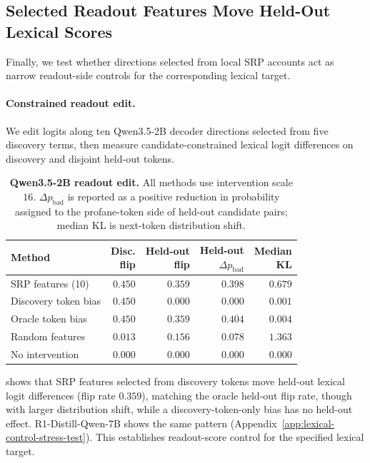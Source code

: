 \FloatBarrier

\subsection{Selected Readout Features Move Held-Out Lexical Scores}
\label{sec:readout-feature-edits}

Finally, we test whether directions selected from local SRP accounts act as
narrow readout-side controls for the corresponding lexical target.

\paragraph{Constrained readout edit.}
We edit logits along ten Qwen3.5-2B decoder directions selected from five
discovery terms, then measure candidate-constrained lexical logit differences on
discovery and disjoint held-out tokens.

\begin{table}[H]
\caption{\textbf{Qwen3.5-2B readout edit.}
All methods use intervention scale \(16\). \(\Delta p_{\mathrm{bad}}\) is
reported as a positive reduction in probability assigned to the profane-token
side of held-out candidate pairs; median KL is next-token distribution shift.}
\label{tab:main-readout-edit}
\centering
\scriptsize
\setlength{\tabcolsep}{2.6pt}
\renewcommand{\arraystretch}{1.06}
\begin{tabular}{@{}lrrrr@{}}
\toprule
Method & \makecell{Disc.\\flip} & \makecell{Held-out\\flip} &
\makecell{Held-out\\\(\Delta p_{\mathrm{bad}}\)} &
\makecell{Median\\KL} \\
\midrule
SRP features (10) & \(0.450\) & \(0.359\) & \(0.398\) & \(0.679\) \\
Discovery token bias & \(0.450\) & \(0.000\) & \(0.000\) & \(0.001\) \\
Oracle token bias & \(0.450\) & \(0.359\) & \(0.404\) & \(0.004\) \\
Random features & \(0.013\) & \(0.156\) & \(0.078\) & \(1.363\) \\
No intervention & \(0.000\) & \(0.000\) & \(0.000\) & \(0.000\) \\
\bottomrule
\end{tabular}
\end{table}

 shows that SRP features selected from discovery
tokens move held-out lexical logit differences (flip rate \(0.359\)), matching
the oracle held-out flip rate, though with larger distribution shift, while a
discovery-token-only bias has no held-out effect. R1-Distill-Qwen-7B shows the
same pattern (Appendix~\ref{app:lexical-control-stress-test}). This establishes
readout-score control for the specified lexical target.

\FloatBarrier
